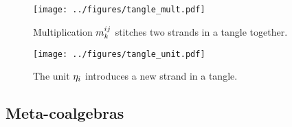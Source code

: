 \documentclass{beamer}
\begin{document}
\begin{frame}
        \begin{figure}
        \centering
        \texttt{[image: ../figures/tangle\_mult.pdf]}
        \caption{
                Multiplication $m^{ij}_{k}$ stitches two strands in a tangle
                together.
        }
        \label{fig:tangle_mult}
\end{figure}
\end{frame}

\begin{frame}
        \begin{figure}
        \centering
        \texttt{[image: ../figures/tangle\_unit.pdf]}
        \caption{The unit $\eta_i$ introduces a new strand in a tangle.}
        \label{fig:tangle_unit}
\end{figure}
\end{frame}

\subsection{Meta-coalgebras}
\end{document}
